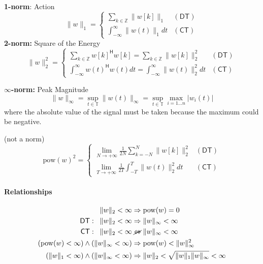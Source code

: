 \textbf{1-norm}: Action
\noindent\begin{equation*}
    \|w\|_1=\begin{cases}
        \sum\limits_{k\in\mathbb{Z}}\|w[k]\|_1 & (\mathsf{DT}) \\
        \int_{-\infty}^\infty\|w(t)\|_1 dt     & (\mathsf{CT})
    \end{cases}
\end{equation*}
\newpar{}
\textbf{2-norm:} Square of the Energy
\noindent\begin{equation*}
    \|w\|_2^2=
    \begin{cases}
        \sum\limits_{k\in\mathbb{Z}}{w[k]}^{\mathsf{H}}w[k] = \sum\limits_{k\in\mathbb{Z}}\|w[k]\|_2^2 & \mathsf{(DT)} \\
        \int_{-\infty}^\infty {w(t)}^{\mathsf{H}}w(t) dt = \int_{-\infty}^\infty\|w(t)\|_2^2 dt        & \mathsf{(CT)}
    \end{cases}
\end{equation*}

\newpar{}
\textbf{$\infty$-norm:} Peak Magnitude
\noindent\begin{equation*}
    \|w\|_\infty=\sup_{t\in\mathbb{T}}\|w(t)\|_\infty=\sup_{t\in\mathbb{T}}\max_{i=1\ldots n}|w_i(t)|
\end{equation*}
where the absolute value of the signal must be taken because the maximum could be negative.

 (not a norm)
\noindent\begin{equation*}
    \mathrm{pow}{(w)}^2=
    \begin{cases}
        \lim\limits_{N\to+\infty}\frac{1}{2N}\sum\limits_{k=-N}^N\|w[k]\|_2^2 & \mathsf{(DT)} \\
        \lim\limits_{T\to+\infty}\frac{1}{2T}\int_{-T}^T\|w(t)\|_2^2 dt       & \mathsf{(CT)}
    \end{cases}
\end{equation*}

\paragraph{Relationships}
\noindent\begin{align*}
    \|w\|_2<\infty                                         & \Rightarrow \mathrm{pow}{(w)}=0                         \\
    \mathsf{DT}:\;\;\|w\|_2<\infty                         & \Rightarrow \|w\|_\infty<\infty                         \\
    \mathsf{CT}:\;\;\|w\|_2<\infty                         & \;\cancel{\Leftrightarrow}\; \|w\|_\infty<\infty        \\
    (\mathrm{pow}{(w)}<\infty) \land (\|w\|_\infty<\infty) & \Rightarrow \mathrm{pow}{(w)} < \|w\|_\infty^2          \\
    (\|w\|_1<\infty) \land (\|w\|_\infty<\infty)           & \Rightarrow \|w\|_2<\sqrt{\|w\|_1\|w\|_\infty} < \infty
\end{align*}


